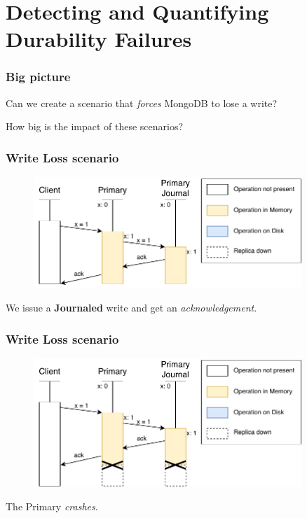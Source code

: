 \documentclass[numfooter,sectionpages,protectFrameTitle, progressbar, cblock, valigncolumns, addlogo]{beamer}
\begin{document}
\section{Detecting and Quantifying Durability Failures}

\begin{frame}
    \frametitle{Big picture}

    \begin{center}
    Can we create a scenario that \textit{forces} MongoDB to lose a write?

    How big is the impact of these scenarios?
    \end{center}

\end{frame}

\begin{frame}
    \frametitle{Write Loss scenario}

    \centering
    \begin{figure}
        \includegraphics[width=0.9\textwidth]{../images/np1.pdf}
    \end{figure}
    We issue a \textbf{Journaled} write and get an \textit{acknowledgement}.

\end{frame}

\begin{frame}
    \frametitle{Write Loss scenario}

    \centering
    \begin{figure}
        \includegraphics[width=0.9\textwidth]{../images/np2.pdf}
    \end{figure}
    The Primary \textit{crashes}.
\end{frame}
\end{document}
